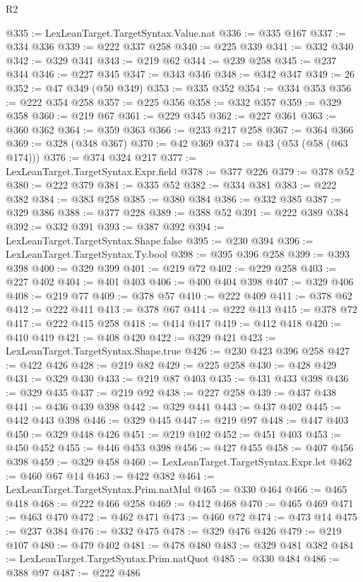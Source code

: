 \begin{lexlean}{R2}
\begin{coremodule}
@335 := LexLeanTarget.TargetSyntax.Value.nat
@336 := @335 @167
@337 := @334 @336
@339 := @222 @337 @258
@340 := @225 @339
@341 := @332 @340
@342 := @329 @341
@343 := @219 @62
@344 := @239 @258
@345 := @237 @344
@346 := @227 @345
@347 := @343 @346
@348 := @342 @347
@349 := 26
@352 := @47 @349 (@50 @349)
@353 := @335 @352
@354 := @334 @353
@356 := @222 @354 @258
@357 := @225 @356
@358 := @332 @357
@359 := @329 @358
@360 := @219 @67
@361 := @229 @345
@362 := @227 @361
@363 := @360 @362
@364 := @359 @363
@366 := @233 @217 @258
@367 := @364 @366
@369 := @328 (@348 @367)
@370 := @42 @369
@374 := @43 (@53 (@58 (@63 @174)))
@376 := @374 @324 @217
@377 := LexLeanTarget.TargetSyntax.Expr.field
@378 := @377 @226
@379 := @378 @52
@380 := @222 @379
@381 := @335 @52
@382 := @334 @381
@383 := @222 @382
@384 := @383 @258
@385 := @380 @384
@386 := @332 @385
@387 := @329 @386
@388 := @377 @228
@389 := @388 @52
@391 := @222 @389 @384
@392 := @332 @391
@393 := @387 @392
@394 := LexLeanTarget.TargetSyntax.Shape.false
@395 := @230 @394
@396 := LexLeanTarget.TargetSyntax.Ty.bool
@398 := @395 @396 @258
@399 := @393 @398
@400 := @329 @399
@401 := @219 @72
@402 := @229 @258
@403 := @227 @402
@404 := @401 @403
@406 := @400 @404 @398
@407 := @329 @406
@408 := @219 @77
@409 := @378 @57
@410 := @222 @409
@411 := @378 @62
@412 := @222 @411
@413 := @378 @67
@414 := @222 @413
@415 := @378 @72
@417 := @222 @415 @258
@418 := @414 @417
@419 := @412 @418
@420 := @410 @419
@421 := @408 @420
@422 := @329 @421
@423 := LexLeanTarget.TargetSyntax.Shape.true
@426 := @230 @423 @396 @258
@427 := @422 @426
@428 := @219 @82
@429 := @225 @258
@430 := @428 @429
@431 := @329 @430
@433 := @219 @87 @403
@435 := @431 @433 @398
@436 := @329 @435
@437 := @219 @92
@438 := @227 @258
@439 := @437 @438
@441 := @436 @439 @398
@442 := @329 @441
@443 := @437 @402
@445 := @442 @443 @398
@446 := @329 @445
@447 := @219 @97
@448 := @447 @403
@450 := @329 @448 @426
@451 := @219 @102
@452 := @451 @403
@453 := @450 @452
@455 := @446 @453 @398
@456 := @427 @455
@458 := @407 @456 @398
@459 := @329 @458
@460 := LexLeanTarget.TargetSyntax.Expr.let
@462 := @460 @67 @14
@463 := @422 @382
@464 := LexLeanTarget.TargetSyntax.Prim.natMul
@465 := @330 @464
@466 := @465 @418
@468 := @222 @466 @258
@469 := @412 @468
@470 := @465 @469
@471 := @463 @470
@472 := @462 @471
@473 := @460 @72
@474 := @473 @14
@475 := @237 @384
@476 := @332 @475
@478 := @329 @476 @426
@479 := @219 @107
@480 := @479 @402
@481 := @478 @480
@483 := @329 @481 @382
@484 := LexLeanTarget.TargetSyntax.Prim.natQuot
@485 := @330 @484
@486 := @388 @97
@487 := @222 @486

\end{coremodule}
\end{lexlean}
